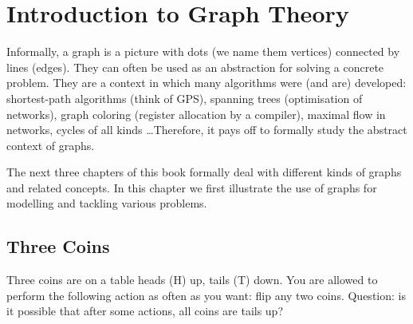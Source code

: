 \chapter{Introduction to Graph Theory}

\begin{summary}
Informally, a graph is a picture with dots (we name them vertices)
connected by lines (edges).
They can often be used as an abstraction for solving a concrete
problem. They are a context in which many algorithms were (and are)
developed: shortest-path algorithms (think of GPS), spanning trees
(optimisation of networks), graph coloring (register allocation by
a compiler), maximal flow in networks, cycles of all kinds
\ldots Therefore, it pays off to formally study the abstract context of
graphs.

The next three chapters of this book formally deal with different kinds
of graphs and related concepts. In this chapter we first illustrate
the use of graphs for modelling and tackling various problems.

\end{summary}

\section{Three Coins}

Three coins are on a table heads (H) up, tails (T) down. You are
allowed to perform the following action as often as you want: flip any
two coins. Question: is it possible that after some actions, all
coins are tails up?

